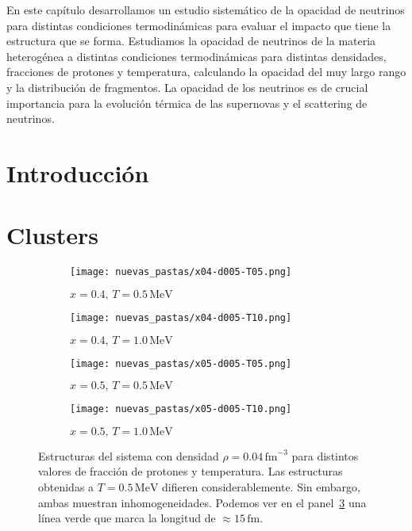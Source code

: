 En este capítulo desarrollamos un estudio sistemático de la opacidad de neutrinos para distintas condiciones termodinámicas para evaluar el impacto que tiene la estructura que se forma.
Estudiamos la opacidad de neutrinos de la materia heterogénea a distintas condiciones termodinámicas para distintas densidades, fracciones de protones y temperatura, calculando la opacidad del muy largo rango y la distribución de fragmentos.
La opacidad de los neutrinos es de crucial importancia para la evolución térmica de las supernovas y el scattering de neutrinos.

\section{Introducción}\label{sc:intro}

\section{Clusters}\label{sc:clusters}

\begin{figure*}[H,floatfix]  \centering
  \begin{subfigure}[h!]{0.40\columnwidth}
    \texttt{[image: nuevas\_pastas/x04-d005-T05.png]}
    \caption{$x=0.4,\, T=0.5\,\text{MeV}$}
    \label{subfig:04-05}
  \end{subfigure}
  \begin{subfigure}[h!]{0.40\columnwidth}
    \texttt{[image: nuevas\_pastas/x04-d005-T10.png]}
    \caption{$x=0.4,\, T=1.0\,\text{MeV}$}
    \label{subfig:04-10}
  \end{subfigure}
  \begin{subfigure}[h!]{0.40\columnwidth}
    \texttt{[image: nuevas\_pastas/x05-d005-T05.png]}
    \caption{$x=0.5,\, T=0.5\,\text{MeV}$}
    \label{subfig:05-05}
  \end{subfigure}
  \begin{subfigure}[h!]{0.40\columnwidth}
    \texttt{[image: nuevas\_pastas/x05-d005-T10.png]}
    \caption{$x=0.5,\, T=1.0\,\text{MeV}$}
    \label{subfig:05-10}
  \end{subfigure}
  \caption{Estructuras del sistema con densidad $\rho = 0.04\,\text{fm}^{-3}$ para distintos valores de fracción de protones y temperatura.
    Las estructuras obtenidas a $T=0.5\,\text{MeV}$ difieren considerablemente.
    Sin embargo, ambas muestran inhomogeneidades.
    Podemos ver en el panel~\ref{subfig:05-05} una línea verde que marca la longitud de $\approx 15\,\text{fm}$.}
  \label{fig:morpho}
\end{figure*}

